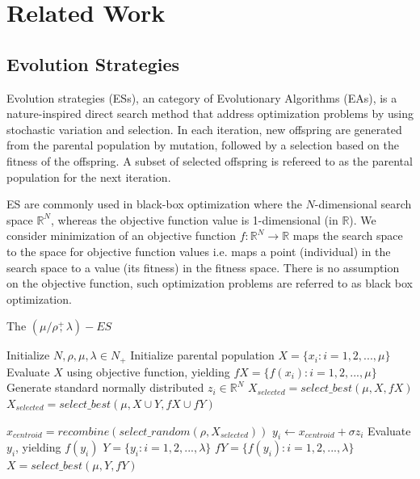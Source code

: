 \section{Related Work}
\subsection{Evolution Strategies}

Evolution strategies (ESs), an category of Evolutionary Algorithms (EAs), is a nature-inspired direct search method that address optimization problems by using stochastic variation and selection. In each iteration, new offspring are generated from the parental population by mutation, followed by a selection based on the fitness of the offspring. A subset of selected offspring is refereed to as the parental population for the next iteration. 

ES are commonly used in black-box optimization where the $N$-dimensional search space $\mathbb{R}^N$, whereas the objective function value is 1-dimensional (in $\mathbb{R}$). We consider minimization of an objective function $f:\mathbb{R}^N \rightarrow \mathbb{R}$ maps the search space to the space for objective function values i.e. maps a point (individual) in the search space to a value (its fitness) in the fitness space. There is no assumption on the objective function, such optimization problems are referred to as black box optimization. 

\begin{algorithm}
\caption{The $(\mu/\rho\overset{+}{,}\lambda)-ES$}
\label{alg:general_es}
\begin{algorithmic}[1]
\STATE Initialize $N,\rho,\mu,\lambda \in N_+$
\STATE Initialize parental population $X=\{x_i: i=1,2,...,\mu\}$
\STATE Evaluate $X$ using objective function, yielding $fX= \{ f(x_i): i=1,2,...,\mu \}$
		\STATE Generate standard normally distributed $z_i \in \mathbb{R}^N $
			\STATE $X_{selected} =  select\_best (\mu,X,fX)$
			\STATE $X_{selected}=  select\_best (\mu,X \cup Y,fX \cup fY)$
		\ENDIF

		\STATE $x_{centroid} =  recombine (select\_random (\rho,X_{selected}))$ 
		\STATE $y_i \leftarrow x_{centroid} + \sigma z_i$
		\STATE Evaluate $y_i$, yielding $f(y_i)$
	\ENDFOR
	\STATE $Y = \{y_i: i=1,2,...,\lambda\}$
	\STATE $fY = \{f(y_i): i=1,2,...,\lambda\}$
	\STATE $X = select\_best (\mu,Y,fY)$
\ENDWHILE

\end{algorithmic}
\end{algorithm}

